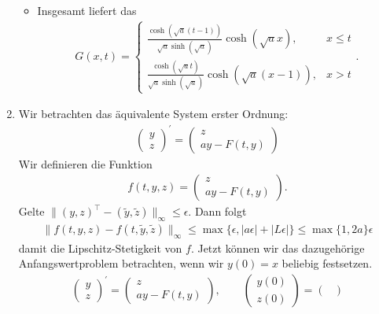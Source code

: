 \begin{solution}
\begin{enumerate}[label = \textbf{\alph*)}]
\begin{itemize}
    \item Insgesamt liefert das
    \begin{align*}
      G(x,t) = \begin{cases}
      \frac{\cosh(\sqrt{a}(t-1))}{\sqrt{a}\sinh(\sqrt{a})}\cosh(\sqrt{a}x), & x \leq t \\
      \frac{\cosh(\sqrt{a}t)}{\sqrt{a}\sinh(\sqrt{a})}\cosh(\sqrt{a}(x-1)), & x > t
      \end{cases}.
    \end{align*}
  \end{itemize}
  \item Wir betrachten das äquivalente System erster Ordnung:
  \begin{align*}
    \begin{pmatrix}
      y \\ z
    \end{pmatrix}^{\prime} =
    \begin{pmatrix}
      z \\ ay - F(t,y)
    \end{pmatrix}
  \end{align*}
  Wir definieren die Funktion
  \begin{align*}
    f(t,y,z) = \begin{pmatrix}
      z \\ ay - F(t,y)
    \end{pmatrix}.
  \end{align*}
  Gelte $\|(y,z)^{\top} - (\widetilde{y},\widetilde{z})\|_{\infty} \leq \epsilon$. Dann folgt
  \begin{align*}
    \|f(t,y,z) - f(t,\widetilde{y},\widetilde{z})\|_{\infty} \leq \max\{\epsilon, |a\epsilon| + |L\epsilon|\} \leq \max\{1,2a\}\epsilon
  \end{align*}
  damit die Lipschitz-Stetigkeit von $f$.
  Jetzt können wir das dazugehörige Anfangswertproblem betrachten, wenn wir $y(0) = x$ beliebig festsetzen.
  \begin{align*}
    \begin{pmatrix}
      y \\ z
    \end{pmatrix}^{\prime} =
    \begin{pmatrix}
      z \\ ay - F(t,y)
    \end{pmatrix}, \qquad
    \begin{pmatrix}
      y(0) \\ z(0)
    \end{pmatrix}
    = \begin{pmatrix}

\end{pmatrix}
\end{align*}
\end{enumerate}
\end{solution}
